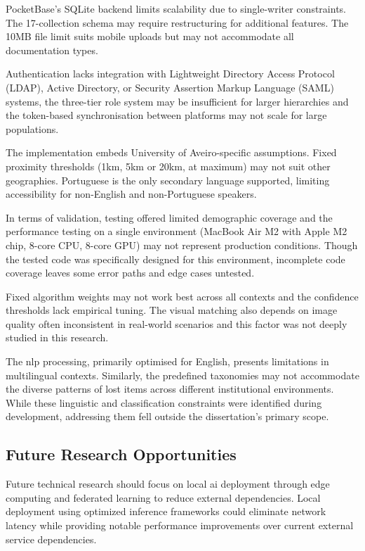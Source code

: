 PocketBase's SQLite backend limits scalability due to single-writer constraints. The 17-collection schema may require restructuring for additional features. The 10MB file limit suits mobile uploads but may not accommodate all documentation types.

Authentication lacks integration with Lightweight Directory Access Protocol (LDAP), Active Directory, or Security Assertion Markup Language (SAML) systems, the three-tier role system may be insufficient for larger hierarchies and the token-based synchronisation between platforms may not scale for large populations.

The implementation embeds University of Aveiro-specific assumptions. Fixed proximity thresholds (1km, 5km or 20km, at maximum) may not suit other geographies. Portuguese is the only secondary language supported, limiting accessibility for non-English and non-Portuguese speakers.

In terms of validation, testing offered limited demographic coverage and the performance testing on a single environment (MacBook Air M2 with Apple M2 chip, 8-core CPU, 8-core GPU) may not represent production conditions. Though the tested code was specifically designed for this environment, incomplete code coverage leaves some error paths and edge cases untested.

Fixed algorithm weights may not work best across all contexts and the confidence thresholds lack empirical tuning. The visual matching also depends on image quality often inconsistent in real-world scenarios and this factor was not deeply studied in this research.

The \ac{nlp} processing, primarily optimised for English, presents limitations in multilingual contexts. Similarly, the predefined taxonomies may not accommodate the diverse patterns of lost items across different institutional environments. While these linguistic and classification constraints were identified during development, addressing them fell outside the dissertation's primary scope.

\subsection{Future Research Opportunities}

Future technical research should focus on local \ac{ai} deployment through edge computing and federated learning to reduce external dependencies. Local deployment using optimized inference frameworks could eliminate network latency while providing notable performance improvements over current external service dependencies.

